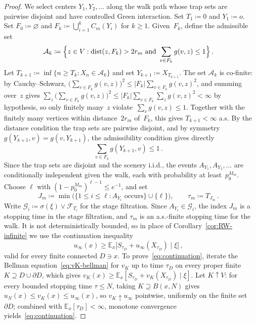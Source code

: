 \documentclass[aop]{imsart}
\theoremstyle{plain}
\theoremstyle{definition}
\newcommand{\E}{\mathbb{E}}
\begin{document}
\begin{proof}
		We select centers $Y_1,Y_2,\ldots$ along the walk path whose trap sets are pairwise disjoint and have controlled Green interaction.
		Set $T_1\coloneqq 0$ and $Y_1\coloneqq o$. Set $F_0\coloneqq\varnothing$ and $F_k\coloneqq\bigcup_{i=1}^k C_m(Y_i)$ for $k\geq 1$.
		Given~$F_k$, define the admissible set
		\[
		\mathcal{A}_k\coloneqq\Bigl\{z\in V:\mathrm{dist}(z,F_k)>2r_m\ \text{and}\ \sum_{v\in F_k}g(v,z)\leq 1\Bigr\}\,.
		\]
		Let $T_{k+1}\coloneqq\inf\{n\geq T_k:X_n\in\mathcal{A}_k\}$ and set $Y_{k+1}\coloneqq X_{T_{k+1}}$.
		The set $\mathcal{A}_k$ is co-finite: by Cauchy--Schwarz, $\bigl(\sum_{v\in F_k}g(v,z)\bigr)^2\leq|F_k|\sum_{v\in F_k}g(v,z)^2$, and summing over~$z$ gives $\sum_z\bigl(\sum_{v\in F_k} g(v,z)\bigr)^2\leq|F_k|\sum_{v\in F_k}\sum_z g(v,z)^2<\infty$ by hypothesis, so only finitely many~$z$ violate~$\sum_v g(v,z)\leq 1$. Together with the finitely many vertices within distance~$2r_m$ of~$F_k$, this gives $T_{k+1}<\infty$ a.s.
		By the distance condition the trap sets are pairwise disjoint, and by symmetry $g(Y_{k+1},v)=g(v,Y_{k+1})$, the admissibility condition gives directly
		\begin{equation}\label{eq:interaction}
			\sum_{v\in F_k}g(Y_{k+1},v)\leq 1\,.
		\end{equation}
		Since the trap sets are disjoint and the scenery i.i.d., the events $A_{Y_1},A_{Y_2},\ldots$ are conditionally independent given the walk, each with probability at least~$p_0^{M_m}$.
		Choose $\ell$ with $(1-p_0^{M_m})^{\ell-1}\leq e^{-1}$, and set
		\[
		J_m\coloneqq\min\bigl(\{1\leq i\leq\ell:A_{Y_i}\text{ occurs}\}\cup\{\ell\}\bigr),\qquad\tau_m\coloneqq T_{J_m}\,.
		\]
		Write $\mathcal{G}_i\coloneqq\sigma(\xi)\vee\mathcal{F}_{T_i}$ for the stage filtration. Since $A_{Y_i}\in\mathcal{G}_i$, the index $J_m$ is a stopping time in the stage filtration, and $\tau_m$ is an a.s.-finite stopping time for the walk. It is not deterministically bounded, so in place of Corollary~\ref{cor:RW-infinite} we use the continuation inequality
		\begin{equation}\label{eq:continuation}
			u_\infty(x)\geq\E_x\bigl[S_{\tau_D}+u_\infty(X_{\tau_D})\mid\xi\bigr]\,,
		\end{equation}
		valid for every finite connected $D\ni x$. To prove~\eqref{eq:continuation}, iterate the Bellman equation~\eqref{eq:vK-bellman} for $v_K$ up to time $\tau_D$ on every proper finite $K\supseteq D\cup\partial D$, which gives $v_K(x)\geq\E_x[S_{\tau_D}+v_K(X_{\tau_D})\mid\xi]$. Let $K\uparrow V$: for every bounded stopping time $\tau\leq N$, taking $K\supseteq B(x,N)$ gives $u_N(x)\leq v_K(x)\leq u_\infty(x)$, so $v_K\uparrow u_\infty$ pointwise, uniformly on the finite set $\partial D$; combined with $\E_x[\tau_D]<\infty$, monotone convergence yields~\eqref{eq:continuation}.


\end{proof}
\end{document}
